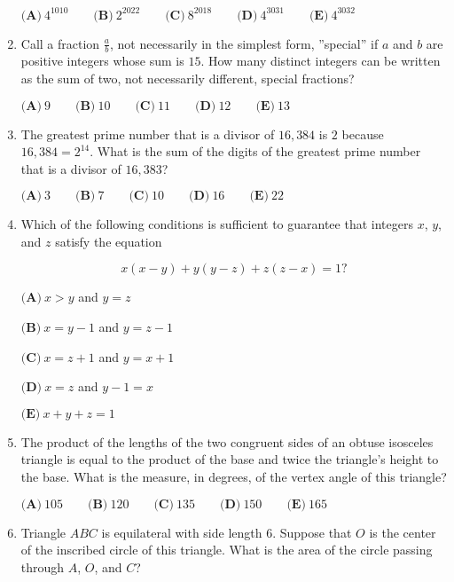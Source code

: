\documentclass{article}
\begin{document}
\begin{enumerate}[label=\arabic*., itemsep=0.5em]
\(\textbf{(A)}\: 4^{1010}\qquad\textbf{(B)} \: 2^{2022}\qquad\textbf{(C)} \: 8^{2018}\qquad\textbf{(D)} \: 4^{3031}\qquad\textbf{(E)} \: 4^{3032}\)\par \vspace{0.5em}\item Call a fraction \(\frac{a}{b}\), not necessarily in the simplest form, ''special'' if \(a\) and \(b\) are positive integers whose sum is \(15\). How many distinct integers can be written as the sum of two, not necessarily different, special fractions?

\(\textbf{(A)}\ 9 \qquad\textbf{(B)}\  10 \qquad\textbf{(C)}\  11 \qquad\textbf{(D)}\ 12 \qquad\textbf{(E)}\ 13\)\par \vspace{0.5em}\item The greatest prime number that is a divisor of \(16{,}384\) is \(2\) because \(16{,}384 = 2^{14}\). What is the sum of the digits of the greatest prime number that is a divisor of \(16{,}383\)?

\(\textbf{(A)} \: 3\qquad\textbf{(B)} \: 7\qquad\textbf{(C)} \: 10\qquad\textbf{(D)} \: 16\qquad\textbf{(E)} \: 22\)\par \vspace{0.5em}\item Which of the following conditions is sufficient to guarantee that integers \(x\), \(y\), and \(z\) satisfy the equation

\begin{equation*}
x(x-y)+y(y-z)+z(z-x) = 1?
\end{equation*}


\(\textbf{(A)} \: x>y\) and \(y=z\)

\(\textbf{(B)} \: x=y-1\) and \(y=z-1\)

\(\textbf{(C)} \: x=z+1\) and \(y=x+1\)

\(\textbf{(D)} \: x=z\) and \(y-1=x\)

\(\textbf{(E)} \: x+y+z=1\)\par \vspace{0.5em}\item The product of the lengths of the two congruent sides of an obtuse isosceles triangle is equal to the product of the base and twice the triangle's height to the base. What is the measure, in degrees, of the vertex angle of this triangle?

\(\textbf{(A)} \: 105 \qquad\textbf{(B)} \: 120 \qquad\textbf{(C)} \: 135 \qquad\textbf{(D)} \: 150 \qquad\textbf{(E)} \: 165\)\par \vspace{0.5em}\item Triangle \(ABC\) is equilateral with side length \(6\). Suppose that \(O\) is the center of the inscribed
circle of this triangle. What is the area of the circle passing through \(A\), \(O\), and \(C\)?


\end{enumerate}
\end{document}
